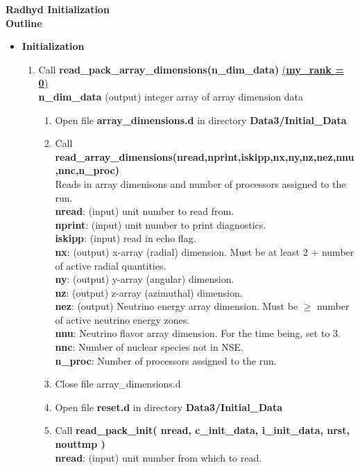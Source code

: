 \documentclass[11pt,doublespace]{article}
\begin{document}
\begin{center}
{\large {\bf Radhyd Initialization\\ Outline}}
\end{center}

\begin{itemize}
  \item {\bf Initialization}
\begin{enumerate}
  \item Call {\bf read\_pack\_array\_dimensions(n\_dim\_data)} \underline{({\bf my\_rank = 0})}\\
  {\bf n\_dim\_data} (output) integer array of array dimension data
\begin{enumerate}
  \item Open file {\bf array\_dimensions.d} in directory {\bf Data3/Initial\_Data}
  \item Call {\bf read\_array\_dimensions(nread,nprint,iskipp,nx,ny,nz,nez,nnu,nnc,n\_proc)}\\
  Reads in array dimenisons and number of processors assigned to the run.\\
  {\bf nread}: (input) unit number to read from.\\
  {\bf nprint}: (input) unit number to print diagnostics.\\
  {\bf iskipp}: (input) read in echo flag.\\
  {\bf nx}: (output) x-array (radial) dimension. Must be at least 2 + number of active radial quantities.\\
  {\bf ny}: (output) y-array (angular) dimension.\\
  {\bf nz}: (output) z-array (azimuthal) dimension.\\
  {\bf nez}: (output) Neutrino energy array dimension. Must be $\ge$ number of active neutrino energy zones.\\
  {\bf nnu}: Neutrino flavor array dimension. For the time being, set to 3.\\
  {\bf nnc}: Number of nuclear species not in NSE.\\
  {\bf n\_proc}: Number of processors assigned to the run.
  \item Close file array\_dimensions.d
  \item Open file {\bf reset.d} in directory {\bf Data3/Initial\_Data}
  \item Call {\bf read\_pack\_init( nread, c\_init\_data, i\_init\_data, nrst, nouttmp )}\\
  {\bf nread}: (input) unit number from which to read.\\

\end{enumerate}
\end{enumerate}
\end{itemize}
\end{document}

